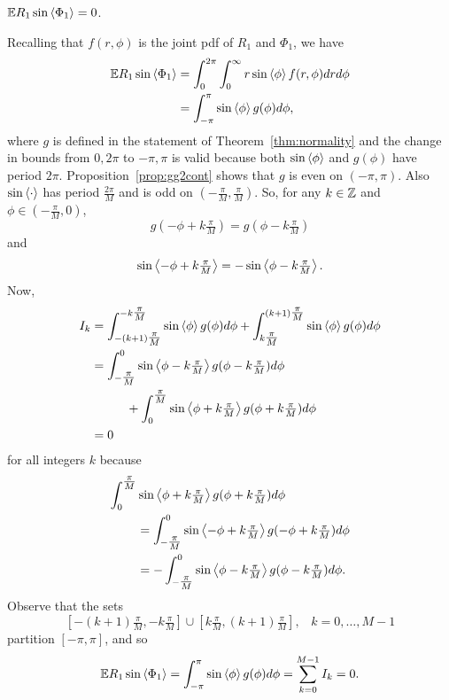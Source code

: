 \documentclass[journal]{IEEEtran}
\begin{document}
\begin{lemma}\label{lem:expectImRfracpart}
${\mathbb E} R_1 \sin\left\langle \Phi_1 \right\rangle = 0$.
\end{lemma}
\begin{IEEEproof}
Recalling that $f(r,\phi)$ is the joint pdf of $R_1$ and $\Phi_1$, we have
\begin{align*}
{\mathbb E} R_1 \sin\left\langle \Phi_1 \right\rangle &= \int_{0}^{2\pi} \int_{0}^\infty r \sin\left\langle \phi \right\rangle f(r,\phi) dr d\phi \\
&= \int_{-\pi}^{\pi} \sin\left\langle \phi \right\rangle g(\phi) d\phi,
\end{align*}
where $g$ is defined in the statement of Theorem~\ref{thm:normality} and the change in bounds from $0, 2\pi$ to $-\pi,\pi$ is valid because both $\sin\left\langle \phi \right\rangle$ and $g(\phi)$ have period $2\pi$.  Proposition~\ref{prop:gg2cont} shows that $g$ is even on $(-\pi,\pi)$.  Also $\sin\left\langle \cdot \right\rangle$ has period $\tfrac{2\pi}{M}$ and is odd on $(-\frac{\pi}{M}, \tfrac{\pi}{M})$.  So, for any $k \in {\mathbb Z}$ and $\phi \in (-\tfrac{\pi}{M}, 0)$,
\[
g(-\phi + k \tfrac{\pi}{M}) = g(\phi - k \tfrac{\pi}{M})
\]
and
\[
\sin\left\langle -\phi + k \tfrac{\pi}{M} \right\rangle = -\sin\left\langle \phi - k \tfrac{\pi}{M} \right\rangle.
\]
Now,
\begin{align*}
I_k &= \int_{-(k+1)\tfrac{\pi}{M}}^{-k\tfrac{\pi}{M}}\sin\left\langle \phi \right\rangle g(\phi) d\phi + \int_{k\tfrac{\pi}{M}}^{(k+1)\tfrac{\pi}{M}}\sin\left\langle \phi \right\rangle g(\phi) d\phi \\
&= \int_{-\tfrac{\pi}{M}}^{0}\sin\left\langle \phi -  k\tfrac{\pi}{M} \right\rangle g(\phi - k\tfrac{\pi}{M}) d\phi \\
&\hspace{1cm}+ \int_{0}^{\tfrac{\pi}{M}}\sin\left\langle \phi + k\tfrac{\pi}{M} \right\rangle g(\phi + k\tfrac{\pi}{M}) d\phi \\
&= 0
\end{align*}
for all integers $k$ because
\begin{align*}
\int_{0}^{\tfrac{\pi}{M}}&\sin\left\langle \phi + k\tfrac{\pi}{M} \right\rangle g(\phi + k\tfrac{\pi}{M}) d\phi \\
&= \int_{-\tfrac{\pi}{M}}^{0}\sin\left\langle -\phi + k\tfrac{\pi}{M} \right\rangle g(-\phi + k\tfrac{\pi}{M}) d\phi \\
&= -\int_{-\tfrac{\pi}{M}}^{0}\sin\left\langle \phi - k\tfrac{\pi}{M} \right\rangle g(\phi - k\tfrac{\pi}{M}) d\phi.
\end{align*}
Observe that the sets
\[
 [-(k+1)\tfrac{\pi}{M},-k\tfrac{\pi}{M}] \cup [k\tfrac{\pi}{M},(k+1)\tfrac{\pi}{M}], \;\;\; k = 0, \dots, M-1
\]
partition $[-\pi, \pi]$, and so
\[
{\mathbb E} R_1 \sin\left\langle \Phi_1 \right\rangle = \int_{-\pi}^{\pi} \sin\left\langle \phi \right\rangle g(\phi) d\phi = \sum_{k=0}^{M-1} I_k = 0.
\]
\end{IEEEproof}
\end{document}
